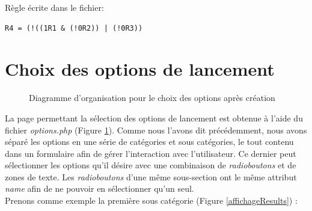 Règle écrite dans le fichier: \\
\begin{DDbox}{\linewidth}
\begin{lstlisting}
R4 = (!((1R1 & (!0R2)) | (!0R3))
\end{lstlisting}
\end{DDbox}

\section{Choix des options de lancement}

\begin{figure}[!ht]
	\begin{center}
		\caption{Diagramme d'organisation pour le choix des options après création}
  		\label{DiagOptions}
  	\end{center}	
\end{figure}

La page permettant la sélection des options de lancement est obtenue à l'aide du fichier \emph{options.php} (Figure \ref{DiagOptions}). Comme nous l'avons dit précédemment, nous avons séparé les options en une série de catégories et sous catégories, le tout contenu dans un formulaire afin de gérer l'interaction avec l'utilisateur. Ce dernier peut sélectionner les options qu'il désire avec une combinaison de \textit{radioboutons} et de zones de texte. Les \textit{radioboutons} d'une même sous-section ont le même attribut \textit{name} afin de ne pouvoir en sélectionner qu'un seul. \\

Prenons comme exemple la première sous catégorie (Figure \ref{affichageResults}) :


